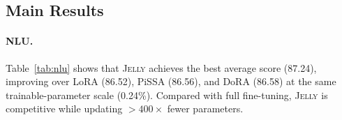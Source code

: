 \documentclass{article}
\newcommand{\jelly}{\textsc{Jelly}}
\begin{document}
\subsection{Main Results}
\label{sec:main_results}

\paragraph{NLU.}
Table~\ref{tab:nlu} shows that \jelly{} achieves the best average score (87.24), improving over LoRA (86.52), PiSSA (86.56), and DoRA (86.58) at the same trainable-parameter scale (0.24\%).
Compared with full fine-tuning, \jelly{} is competitive while updating $>400\times$ fewer parameters.
\end{document}
